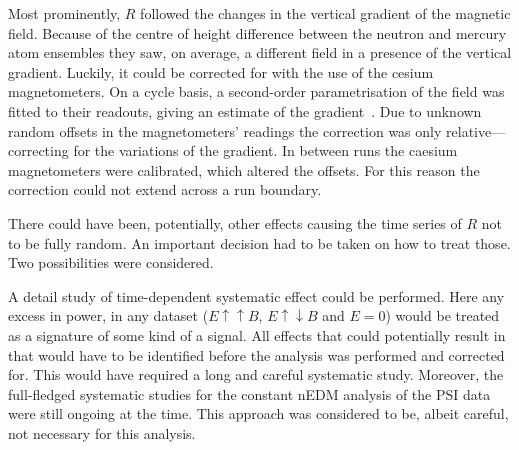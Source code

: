 Most prominently, $R$ followed the changes in the vertical gradient of the magnetic field. Because of the centre of height difference between the neutron and mercury atom ensembles they saw, on average, a different field in a presence of the vertical gradient.  Luckily, it could be corrected for with the use of the cesium magnetometers. On a cycle basis, a second-order parametrisation of the field was fitted to their readouts, giving an estimate of the gradient~\cite{Afach2014magmoment,WurstenThesis}. Due to unknown random offsets in the magnetometers' readings the correction was only relative---correcting for the variations of the gradient. In between runs the caesium magnetometers were calibrated, which altered the offsets. For this reason the correction could not extend across a run boundary. 

There could have been, potentially, other effects causing the time series of $R$ not to be fully random. An important decision had to be taken on how to treat those. Two possibilities were considered.

A detail study of time-dependent systematic effect could be performed.
Here any excess in power, in any dataset ($E \uparrow \uparrow B$, $E \uparrow \downarrow B$ and $E=0$) would be treated as a signature of some kind of a signal. All effects that could potentially result in that would have to be identified before the analysis was performed and corrected for. This would have required a long and careful systematic study. Moreover, the full-fledged systematic studies for the constant nEDM analysis of the PSI data were still ongoing at the time. This approach was considered to be, albeit careful, not necessary for this analysis.


